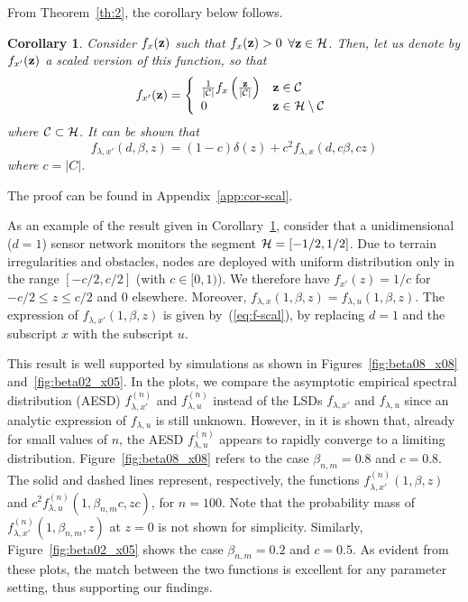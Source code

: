 \documentclass[11pt, draftcls, onecolumn, a4paper]{IEEEtran}
\newtheorem{corollary}{Corollary}[section]
\newcommand{\zv}{{\bf z}}
\newcommand{\Cc}{{\cal C}}
\newcommand{\Hc}{{\cal H}}
\begin{document}
From Theorem~\ref{th:2}, the corollary below follows.
\begin{corollary}
\label{cor-scal}
Consider $f_{x}(\zv)$ such that  $f_{x}(\zv)>0$ $\forall\zv \in \Hc$.
Then, let us denote
by $f_{x'}(\zv)$ a scaled version of this function, so that 
\begin{equation}
f_{x'}(\zv) = \left \{ \begin{array}{ll}
\frac{1}{|\Cc|}f_x\left(\frac{\zv}{|\Cc |}\right) & \zv \in \Cc \\
0 & \zv \in \Hc\setminus\Cc
\end{array} \right.
\label{eq:fxi'_scaled}
\end{equation}
where $\Cc \subset \Hc$.  It can be shown that
\begin{equation} f_{\lambda,x'}(d,\beta,z) = 
\left(1-c\right)\delta(z)+c^2f_{\lambda,x}(d,c \beta, cz) 
\label{eq:f-scal}
\end{equation} 
where $c=|C|$.
\end{corollary}
\begin{IEEEproof}
The proof can be found in Appendix~\ref{app:cor-scal}.
\end{IEEEproof}

As an example of the result given in Corollary~\ref{cor-scal}, consider
that a unidimensional ($d=1$) sensor network monitors the segment
$\Hc=[-1/2,1/2]$. Due to terrain irregularities and obstacles, nodes
are deployed with uniform distribution only in the range $[-c/2,c/2]$
(with $c\in [0,1)$).  We therefore have $f_{x'}(z)= 1/c$ for
  $-c/2\le z \le c/2$ and 0 elsewhere.  Moreover,
  $f_{\lambda,x}(1,\beta,z) = f_{\lambda,u}(1,\beta,z)$. The
  expression of $f_{\lambda,x'}(1,\beta,z)$ is given
  by~(\ref{eq:f-scal}), by replacing $d=1$ and the
  subscript $x$ with the subscript $u$. 

This result is well
  supported by simulations as shown in Figures~\ref{fig:beta08_x08}
  and~\ref{fig:beta02_x05}.
In the plots, we compare the asymptotic empirical spectral distribution 
(AESD) $f^{(n)}_{\lambda,x'}$ and
$f^{(n)}_{\lambda,u}$ instead of the LSDs $f_{\lambda,x'}$ and
$f_{\lambda,u}$ since an analytic expression of $f_{\lambda,u}$ is
still unknown.  However, in \cite{TSP1,TSP2,TSP3} it is shown
that, already for small values of $n$, the AESD 
$f^{(n)}_{\lambda,u}$ appears to rapidly
converge to a limiting distribution.
Figure~\ref{fig:beta08_x08} refers to the case $\beta_{n,m}=0.8$
and $c=0.8$. The solid and dashed lines represent, respectively, the
functions $f^{(n)}_{\lambda,x'}(1,\beta,z)$ and
$c^2f^{(n)}_{\lambda,u}(1,\beta_{n,m} c,zc)$, for $n=100$.  Note that
the probability mass of $f^{(n)}_{\lambda,x'}(1,\beta_{n,m},z)$ at $z=0$ is not
shown for simplicity. Similarly, Figure~\ref{fig:beta02_x05} shows
the case $\beta_{n,m}=0.2$ and $c=0.5$. As evident from these plots,
the match between the two functions is excellent for any parameter
setting, thus supporting our findings.
\end{document}
